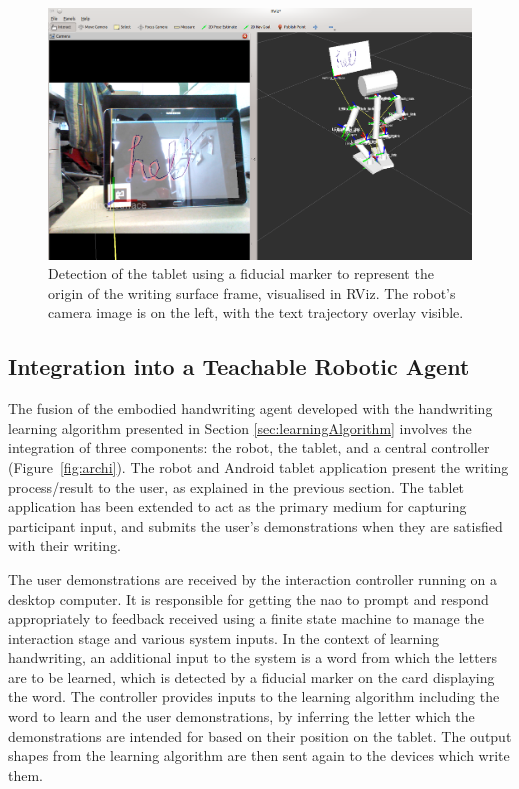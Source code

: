 \documentclass{sig-alternate}
\begin{document}
\begin{figure}[htpb]
    \centering
    \includegraphics[width=0.9\columnwidth]{figures/chilitagDetection_cameraOverlay.png}
    \caption{\label{fig:tabletDetection}Detection of the tablet using a fiducial
    marker to represent the origin of the writing surface frame, visualised in RViz. The robot's
    camera image is on the left, with the text trajectory overlay visible.}

\end{figure}


\subsection{Integration into a Teachable Robotic Agent}

The fusion of the embodied handwriting agent developed with the handwriting
learning algorithm presented in Section \ref{sec:learningAlgorithm} involves the
integration of three components: the robot, the tablet, and a central controller
(Figure~\ref{fig:archi}). The robot and Android tablet application present the
writing process/result to the user, as explained in the previous section.
The tablet application has been extended to act as the primary medium for
capturing participant input, and submits the user's demonstrations when they are
satisfied with their writing. 

The user demonstrations are received by the
interaction controller running on a desktop computer. It is responsible for
getting the {\sc nao} to prompt and respond appropriately to feedback received using
a finite state machine to manage the interaction stage and various system
inputs. In the context of learning handwriting, an additional input to the system 
is a word from which the letters are to be learned, which is detected by a fiducial 
marker on the card displaying the word.
The controller provides inputs to the learning algorithm including the word to learn
and the user demonstrations, by inferring the letter which the demonstrations are 
intended for based on their position on the tablet. The output shapes from the 
learning algorithm are then sent again to the devices which write them.
\end{document}
